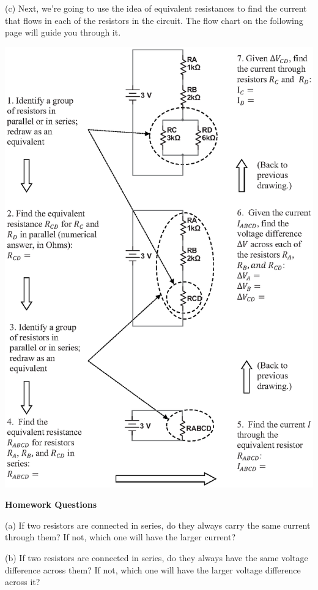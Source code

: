 (c) Next, we're going to use the idea of equivalent resistances to find the current that flows in each of the resistors in the circuit.  The flow chart on the following page will guide you through it.

\begin{center}
\includegraphics[width=1.0\textwidth]{electric_circuits2/step_by_step_circuit_bw.eps}
\end{center}
\textbf{Homework Questions} \par
\nopagebreak
(a) If two resistors are connected in series, do they always carry the same current through them? If not, which one will have the larger current?
\vspace {0.7 in}

(b) If two resistors are connected in series, do they always have the same voltage difference across them?  If not, which one will have the larger voltage difference across it?
\vspace {0.7 in}

